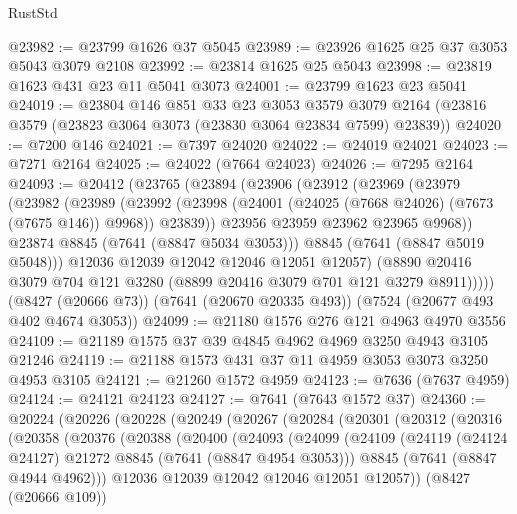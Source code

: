 \begin{lexlean}{RustStd}
\begin{coremodule}
{\begin{coremodule}
{{{{{{{{{{{{{{{{{{{{{{{{{{{{{{{{@23982 := @23799 @1626 @37 @5045
@23989 := @23926 @1625 @25 @37 @3053 @5043 @3079 @2108
@23992 := @23814 @1625 @25 @5043
@23998 := @23819 @1623 @431 @23 @11 @5041 @3073
@24001 := @23799 @1623 @23 @5041
@24019 := @23804
    @146
    @851
    @33
    @23
    @3053
    @3579
    @3079
    @2164
    (@23816 @3579 (@23823 @3064 @3073 (@23830 @3064 @23834 @7599) @23839))
@24020 := @7200 @146
@24021 := @7397 @24020
@24022 := @24019 @24021
@24023 := @7271 @2164
@24025 := @24022 (@7664 @24023)
@24026 := @7295 @2164
@24093 := @20412
    (@23765
      (@23894
        (@23906
          (@23912
            (@23969
              (@23979
                (@23982
                  (@23989
                    (@23992
                      (@23998 (@24001 (@24025 (@7668 @24026) (@7673 (@7675 @146)) @9968)) @23839))
                    @23956
                    @23959
                    @23962
                    @23965
                    @9968))
                @23874
                @8845
                (@7641 (@8847 @5034 @3053)))
              @8845
              (@7641 (@8847 @5019 @5048)))
            @12036
            @12039
            @12042
            @12046
            @12051
            @12057)
          (@8890 @20416 @3079 @704 @121 @3280 (@8899 @20416 @3079 @701 @121 @3279 @8911)))))
    (@8427 (@20666 @73))
    (@7641 (@20670 @20335 @493))
    (@7524 (@20677 @493 @402 @4674 @3053))
@24099 := @21180 @1576 @276 @121 @4963 @4970 @3556
@24109 := @21189 @1575 @37 @39 @4845 @4962 @4969 @3250 @4943 @3105 @21246
@24119 := @21188 @1573 @431 @37 @11 @4959 @3053 @3073 @3250 @4953 @3105
@24121 := @21260 @1572 @4959
@24123 := @7636 (@7637 @4959)
@24124 := @24121 @24123
@24127 := @7641 (@7643 @1572 @37)
@24360 := @20224
    (@20226
      (@20228
        (@20249
          (@20267
            (@20284
              (@20301
                (@20312
                  (@20316
                    (@20358
                      (@20376
                        (@20388
                          (@20400
                            (@24093
                              (@24099
                                (@24109
                                  (@24119 (@24124 @24127) @21272 @8845 (@7641 (@8847 @4954 @3053)))
                                  @8845
                                  (@7641 (@8847 @4944 @4962)))
                                @12036
                                @12039
                                @12042
                                @12046
                                @12051
                                @12057))
                            (@8427 (@20666 @109))
}}}}}}}}}}}}}}}}}}}}}}}}}}}}}}}}
\end{coremodule}}
\end{coremodule}
\end{lexlean}
